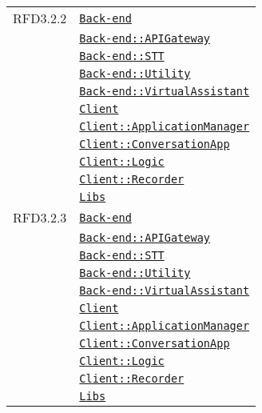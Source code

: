 \begin{longtable}{|>{\centering}m{3cm}|m{10cm}<{\centering}|}
RFD3.2.2 & \hyperref[Back-end]{\texttt{Back-end}}\\
& \hyperref[Back-end::APIGateway]{\texttt{Back-end::APIGateway}}\\
& \hyperref[Back-end::STT]{\texttt{Back-end::STT}}\\
& \hyperref[Back-end::Utility]{\texttt{Back-end::Utility}}\\
& \hyperref[Back-end::VirtualAssistant]{\texttt{Back-end::VirtualAssistant}}\\
& \hyperref[Client]{\texttt{Client}}\\
& \hyperref[Client::ApplicationManager]{\texttt{Client::ApplicationManager}}\\
& \hyperref[Client::ConversationApp]{\texttt{Client::ConversationApp}}\\
& \hyperref[Client::Logic]{\texttt{Client::Logic}}\\
& \hyperref[Client::Recorder]{\texttt{Client::Recorder}}\\
& \hyperref[Libs]{\texttt{Libs}}\\ \hline

RFD3.2.3 & \hyperref[Back-end]{\texttt{Back-end}}\\
& \hyperref[Back-end::APIGateway]{\texttt{Back-end::APIGateway}}\\
& \hyperref[Back-end::STT]{\texttt{Back-end::STT}}\\
& \hyperref[Back-end::Utility]{\texttt{Back-end::Utility}}\\
& \hyperref[Back-end::VirtualAssistant]{\texttt{Back-end::VirtualAssistant}}\\
& \hyperref[Client]{\texttt{Client}}\\
& \hyperref[Client::ApplicationManager]{\texttt{Client::ApplicationManager}}\\
& \hyperref[Client::ConversationApp]{\texttt{Client::ConversationApp}}\\
& \hyperref[Client::Logic]{\texttt{Client::Logic}}\\
& \hyperref[Client::Recorder]{\texttt{Client::Recorder}}\\
& \hyperref[Libs]{\texttt{Libs}}\\ \hline


\end{longtable}
